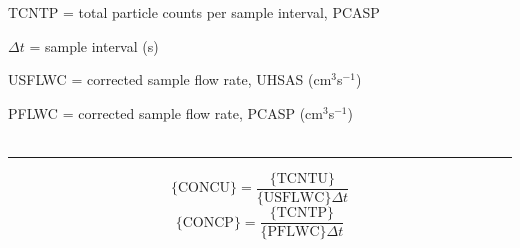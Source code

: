 \begin{hangparagraphs}
{\begin{minipage}[t]{0.9\textwidth}
TCNTP = total particle counts per sample interval, PCASP

$\Delta t$ = sample
interval (s)

USFLWC = corrected sample flow rate, UHSAS (cm$^{3}$s$^{-1}$)

PFLWC = corrected sample flow rate, PCASP (cm$^{3}$s$^{-1}$)\\
\\
\rule[0.5ex]{1\linewidth}{1pt}

\begin{equation}
\mathrm{\{CONCU\}}=\frac{\mathrm{\{TCNTU\}}}{\mathrm{\{USFLWC\}}\Delta t}\label{eq:12.5}
\end{equation}
\begin{equation}
\mathrm{\{CONCP\}}=\frac{\mathrm{\{TCNTP\}}}{\mathrm{\{PFLWC\}}\Delta t}\label{eq:12.6}
\end{equation}
%
\end{minipage}} \\
\\
\end{hangparagraphs}


